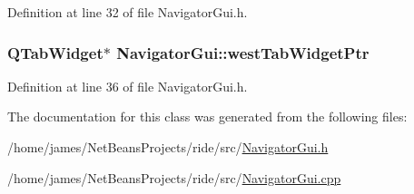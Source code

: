 Definition at line 32 of file Navigator\-Gui.\-h.

\hypertarget{class_navigator_gui_aea3dc7b54a723ca369742ee6a0f34f03}{
\subsubsection[{west\-Tab\-Widget\-Ptr}]{\setlength{\rightskip}{0pt plus 5cm}Q\-Tab\-Widget$\ast$ Navigator\-Gui\-::west\-Tab\-Widget\-Ptr\hspace{0.3cm}{\ttfamily [private]}}}\label{class_navigator_gui_aea3dc7b54a723ca369742ee6a0f34f03}


Definition at line 36 of file Navigator\-Gui.\-h.



The documentation for this class was generated from the following files\-:\begin{DoxyCompactItemize}
\item 
/home/james/\-Net\-Beans\-Projects/ride/src/\hyperlink{_navigator_gui_8h}{Navigator\-Gui.\-h}\item 
/home/james/\-Net\-Beans\-Projects/ride/src/\hyperlink{_navigator_gui_8cpp}{Navigator\-Gui.\-cpp}\end{DoxyCompactItemize}
